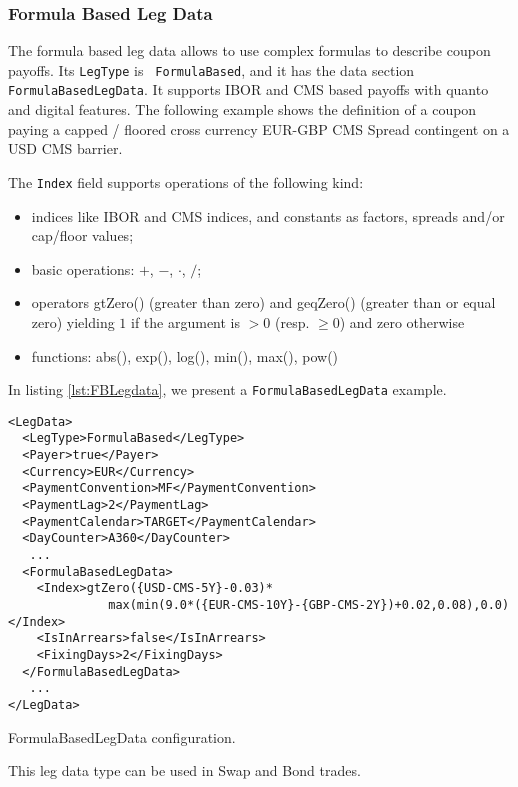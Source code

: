 \subsubsection{Formula Based Leg Data}
\label{ss:formulalegdata}

The formula based leg data allows to use complex formulas to describe coupon payoffs. Its {\tt LegType} is {\tt
  FormulaBased}, and it has the data section {\tt FormulaBasedLegData}. It supports IBOR and CMS based payoffs with
quanto and digital features. The following example shows the definition of a coupon paying a capped / floored cross
currency EUR-GBP CMS Spread contingent on a USD CMS barrier.

The {\tt Index} field supports operations of the following kind:
\begin{itemize}
\item indices like IBOR and CMS indices, and constants as factors,
  spreads and/or cap/floor values;
\item basic operations: $+$, $-$, $\cdot$, $/$;
\item operators gtZero() (greater than zero) and geqZero() (greater than or equal zero) yielding $1$ if the argument is
  $>0$ (resp. $\geq 0$) and zero otherwise
\item functions: abs(), exp(), log(), min(), max(), pow()
\end{itemize}
%
In listing \ref{lst:FBLegdata}, we present a {\tt FormulaBasedLegData} example. 
%
\begin{listing}
\begin{verbatim}
<LegData>
  <LegType>FormulaBased</LegType>
  <Payer>true</Payer>
  <Currency>EUR</Currency>
  <PaymentConvention>MF</PaymentConvention>
  <PaymentLag>2</PaymentLag>
  <PaymentCalendar>TARGET</PaymentCalendar>
  <DayCounter>A360</DayCounter>
   ...
  <FormulaBasedLegData>
    <Index>gtZero({USD-CMS-5Y}-0.03)*
              max(min(9.0*({EUR-CMS-10Y}-{GBP-CMS-2Y})+0.02,0.08),0.0)</Index>
    <IsInArrears>false</IsInArrears>
    <FixingDays>2</FixingDays>
  </FormulaBasedLegData>
   ...
</LegData>
\end{verbatim}
\caption{FormulaBasedLegData configuration.}
\label{lst:FBLegdata}
\end{listing}

This leg data type can be used in Swap and Bond trades.
